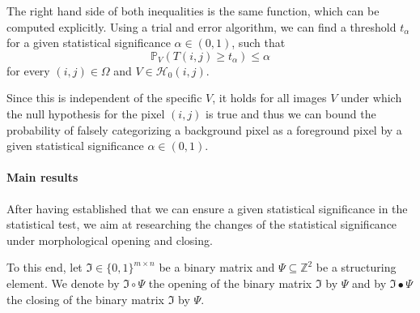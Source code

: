 \documentclass[a4paper,12pt]{article}
\theoremstyle{plain}
\theoremstyle{definition}
\begin{document}
The right hand side of both inequalities is the same function, which can be computed explicitly. Using a trial and error algorithm, we can find a threshold $t_\alpha$ for a given statistical significance $\alpha \in ( 0, 1 )$, such that
\begin{equation*}
	\mathbb{P}_V( T(i, j) \geq t_\alpha ) \leq \alpha
\end{equation*}
for every $(i, j) \in \Omega$ and $V \in \mathcal{H}_0(i, j)$.

Since this is independent of the specific $V$, it holds for all images $V$ under which the null hypothesis for the pixel $(i, j)$ is true and thus we can bound the probability of falsely categorizing a background pixel as a foreground pixel by a given statistical significance $\alpha \in ( 0, 1 )$.

\paragraph{Main results}

After having established that we can ensure a given statistical significance in the statistical test, we aim at researching the changes of the statistical significance under morphological opening and closing.

To this end, let $\mathfrak{I} \in \{ 0, 1 \}^{m \times n}$ be a binary matrix and $\Psi \subseteq \mathbb{Z}^2$ be a structuring element. We denote by $\mathfrak{I} \circ \Psi$ the opening of the binary matrix $\mathfrak{I}$ by $\Psi$ and by $\mathfrak{I} \bullet \Psi$ the closing of the binary matrix $\mathfrak{I}$ by $\Psi$.
\end{document}
